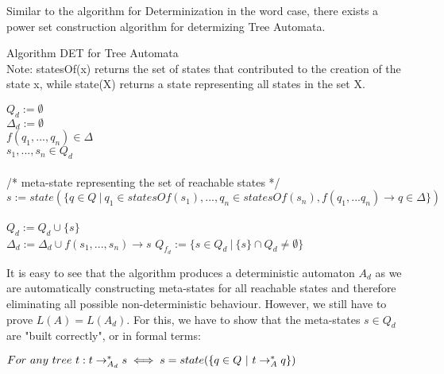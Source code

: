 \documentclass{llncs}
\begin{document}
Similar to the algorithm for Determinization in the word case, there exists a power set construction algorithm for determizing Tree Automata.

\begin{definition}{Algorithm DET for Tree Automata \cite{tata-nfta}}\\
	Note: statesOf(x) returns the set of states that contributed to the creation of the state x, while state(X) returns a state representing all states in the set X.
\begin{algorithm}[H]
	\(Q_d := \emptyset\)\\
	\(\Delta_d := \emptyset\)
	\\
		 {
			\( f(q_1,...,q_n) \in \Delta\)\\
			\(s_1,...,s_n \in Q_d\)\\
			~\\
			/* meta-state representing the set of reachable states */ \\
			\( s := state(\{ q \in Q ~|~ q_1 \in statesOf(s_1),..., q_n \in statesOf(s_n), f(q_1,...q_n) \rightarrow q \in \Delta \}) \)\\~\\
			\(Q_d := Q_d \cup \{s\}\)\\
			\(\Delta_d := \Delta_d \cup f(s_1,...,s_n) \rightarrow s \)
		}
	\(Q_{f_d} := \{ s \in Q_d ~ | ~ \{s\} \cap Q_d \neq \emptyset \}\)\\
\end{algorithm}
\end{definition}

\pagebreak

It is easy to see that the algorithm produces a deterministic automaton \(A_d\) as we are automatically constructing meta-states for all reachable states and therefore eliminating all possible non-deterministic behaviour. However, we still have to prove \(L(A) = L(A_d)\). For this, we have to show that the meta-states \(s \in Q_d\) are "built correctly", or in formal terms:

\begin{center}
	\(For~any~tree~t: t \rightarrow_{A_d}^* s \iff s = state(\{q \in Q ~|~ t \rightarrow_A^* q\})\)
\end{center}
\end{document}
